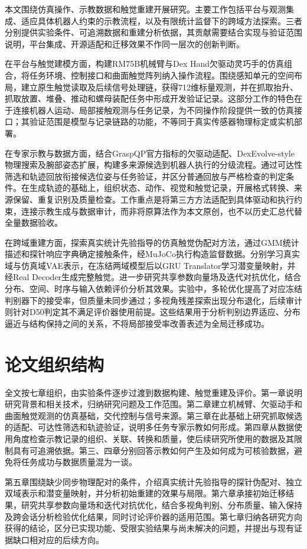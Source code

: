 本文围绕仿真操作、示教数据和触觉重建开展研究。主要工作包括平台与观测集成、适应具体机器人约束的示教流程，以及有限统计监督下的跨域方法探索。三者分别提供实验条件、可追溯数据和重建分析依据，其贡献需要结合实现与验证范围说明，平台集成、开源适配和迁移效果不作同一层次的创新判断。

在平台与触觉建模方面，构建RM75B机械臂与Dex Hand欠驱动灵巧手的仿真组合，将任务环境、控制接口和曲面触觉阵列纳入操作流程。围绕感知单元的空间布局，建立原生触觉读取及后续信号处理链，获得712维标量观测，并在抓取抬升、抓取放置、堆叠、推动和螺母装配任务中形成开发验证记录。这部分工作的特色在于连接机器人运动、局部接触观测与任务记录，为不同操作阶段提供一致的仿真接口；其验证范围是模型与记录链路的功能，不等同于真实传感器物理标定或实机部署。

在专家示教与数据方面，结合GraspQP官方指标的欠驱动适配、DexEvolve-style物理搜索及腕部姿态扩展，构建多来源候选到机器人执行的分级流程。通过可达性筛选和轨迹回放衔接候选位姿与任务验证，并区分普通回放与严格检查的判定条件。在生成轨迹的基础上，组织状态、动作、视觉和触觉记录，开展格式转换、来源保留、重复识别及质量检查。工作重点是将第三方方法适配到具体驱动和执行约束，连接示教生成与数据审计，而非将原算法作为本文原创，也不以历史汇总代替全量数据验收。

在跨域重建方面，探索真实统计先验指导的仿真触觉伪配对方法，通过GMM统计描述和探针响应字典确定接触条件，经MuJoCo执行构造监督数据。分别学习真实域与仿真域VAE表示，在冻结两域模型后以GRU Translator学习潜变量映射，并经Real Decoder生成完整触觉。进一步研究共享参数向量场及迭代对抗优化，结合分布、空间、时序与输入依赖评价分析其效果。实验中，多轮优化提高了对应冻结判别器下的接受率，但质量未同步通过；多视角残差探索出现分布退化，后续审计则针对D50判定其不满足评价器使用前提。这些结果用于分析判别边界适应、分布逼近与结构保持之间的关系，不将局部接受率改善表述为全局迁移成功。

\section{论文组织结构}
\label{sec:thesis_structure}

全文按七章组织，由实验条件逐步过渡到数据构建、触觉重建及评价。第一章说明研究背景和相关技术，归纳研究问题及工作范围。第二章建立机械臂、欠驱动手和曲面触觉观测的仿真基础，交代控制与信号来源。第三章在此基础上研究抓取候选的适配、可达性筛选和轨迹验证，说明多任务专家示教如何形成。第四章从数据使用角度检查示教记录的组织、关联、转换和质量，使后续研究所使用的数据及其限制具有可追溯依据。第三、四章分别回答示教如何产生及如何成为可核验数据，避免将任务成功与数据质量混为一谈。

第五章围绕缺少同步物理配对的条件，介绍真实统计先验指导的探针伪配对、独立双域表示和潜变量映射，并分析初始重建的效果与局限。第六章承接初始迁移结果，研究共享参数向量场和迭代对抗优化，结合多视角判别、分布质量、输入保持及跨会话分析检验优化结果，同时讨论评价器的适用范围。第七章归纳各研究方向获得的结论，区分已实现功能、受限实验结果与尚未解决的问题，并提出与现有证据缺口相对应的后续方向。
